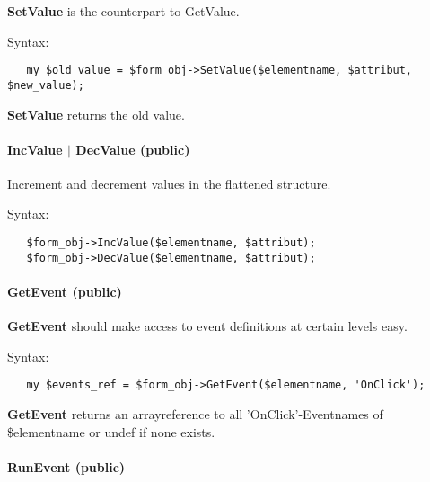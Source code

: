 \textbf{SetValue} is the counterpart to GetValue.



Syntax:

\begin{verbatim}
   my $old_value = $form_obj->SetValue($elementname, $attribut, $new_value);
\end{verbatim}


\textbf{SetValue} returns the old value.

\paragraph*{IncValue $|$ DecValue (public)\label{Apiis::Form::Init_--_base_package_for_Form_objects_of_all_types_IncValue_DecValue_public_}}


Increment and decrement values in the flattened structure.



Syntax:

\begin{verbatim}
   $form_obj->IncValue($elementname, $attribut);
   $form_obj->DecValue($elementname, $attribut);
\end{verbatim}
\paragraph*{GetEvent (public)\label{Apiis::Form::Init_--_base_package_for_Form_objects_of_all_types_GetEvent_public_}}


\textbf{GetEvent} should make access to event definitions at certain levels easy.



Syntax:

\begin{verbatim}
   my $events_ref = $form_obj->GetEvent($elementname, 'OnClick');
\end{verbatim}


\textbf{GetEvent} returns an arrayreference to all 'OnClick'-Eventnames
of \$elementname or undef if none exists.

\paragraph*{RunEvent (public)\label{Apiis::Form::Init_--_base_package_for_Form_objects_of_all_types_RunEvent_public_}}


